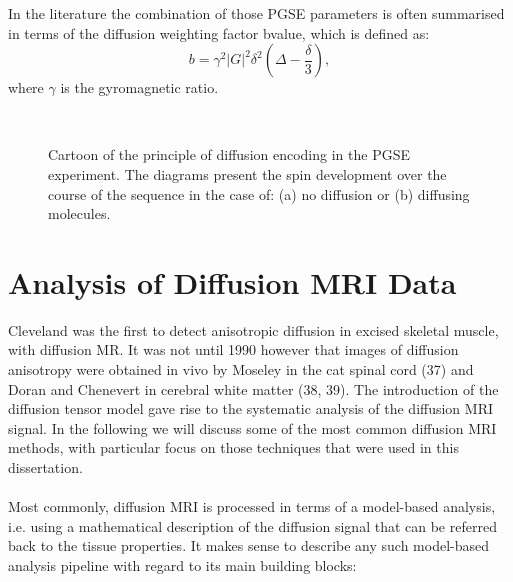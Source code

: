 In the literature the combination of those PGSE parameters is often summarised in terms of the diffusion weighting factor {\gls{bvalue}}, which is defined as:
\begin{equation}
	b = \gamma^2|G|^2\delta^2(\Delta-\frac{\delta}{3}),
    \label{eq:bvalue}
\end{equation}
where $\gamma$ is the gyromagnetic ratio.

\begin{figure}[H]
\centering
{}\\
\caption{Cartoon of the principle of diffusion encoding in the PGSE experiment. The diagrams present the spin development over the course of the sequence in the case of: (a) no diffusion or (b) diffusing molecules.}
\label{fig:chap2 diffusion illustration}
\end{figure}

\section{Analysis of Diffusion MRI Data}
Cleveland \citep{Cleveland:XXX} was the first to detect anisotropic diffusion in excised skeletal muscle, with diffusion MR. It was not until 1990 however that images of diffusion anisotropy were obtained in vivo by Moseley in the cat spinal cord (37) and Doran and Chenevert in cerebral white matter (38, 39). The introduction of the diffusion tensor model gave rise to the systematic analysis of the diffusion MRI signal. In the following we will discuss some of the most common diffusion MRI methods, with particular focus on those techniques that were used in this dissertation. 

\paragraph{}
Most commonly, diffusion MRI is processed in terms of a model-based analysis, i.e. using a mathematical description of the diffusion signal that can be referred back to the tissue properties. It makes sense to describe any such model-based analysis pipeline with regard to its main building blocks: 

